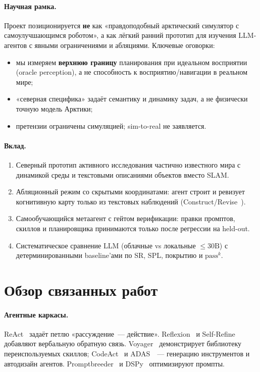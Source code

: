 \documentclass[11pt,a4paper]{article}
\begin{document}
\paragraph{Научная рамка.}
Проект позиционируется \textbf{не} как «правдоподобный арктический симулятор
с самоулучшающимся роботом», а как лёгкий ранний прототип для изучения
LLM-агентов с явными ограничениями и абляциями.
Ключевые оговорки:
\begin{itemize}[leftmargin=*]
  \item мы измеряем \textbf{верхнюю границу} планирования при идеальном восприятии
        (oracle perception), а не способность к восприятию/навигации в реальном мире;
  \item «северная специфика» задаёт семантику и динамику задач, а не физически
        точную модель Арктики;
  \item претензии ограничены симуляцией; sim-to-real не заявляется.
\end{itemize}

\paragraph{Вклад.}
\begin{enumerate}[leftmargin=*]
  \item Северный прототип активного исследования частично известного мира
        с динамикой среды и текстовыми описаниями объектов вместо SLAM.
  \item Абляционный режим со скрытыми координатами: агент строит и ревизует
        когнитивную карту только из текстовых наблюдений
        (Construct/Revise~\cite{theoryofspace2026}).
  \item Самообучающийся метаагент с гейтом верификации: правки промптов,
        скиллов и планировщика принимаются только после регрессии на held-out.
  \item Систематическое сравнение LLM (облачные vs локальные \(\le 30\mathrm{B}\))
        с детерминированными baseline'ами по SR, SPL, покрытию и \(\mathrm{pass}^k\).
\end{enumerate}

\section{Обзор связанных работ}
\label{sec:related}

\paragraph{Агентные каркасы.}
ReAct~\cite{yao2022react} задаёт петлю «рассуждение~--- действие».
Reflexion~\cite{shinn2023reflexion} и Self-Refine~\cite{madaan2023selfrefine}
добавляют вербальную обратную связь.
Voyager~\cite{wang2023voyager} демонстрирует библиотеку переиспользуемых скиллов;
CodeAct~\cite{wang2024codeact} и ADAS~\cite{hu2024adas}~--- генерацию инструментов
и автодизайн агентов.
Promptbreeder~\cite{fernando2023promptbreeder} и DSPy~\cite{khattab2023dspy}
оптимизируют промпты.
\end{document}
